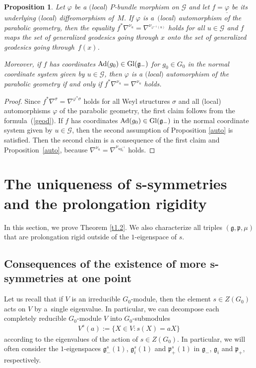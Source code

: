 \documentclass[pdftex]{sigma}
\newcommand{\si}{\sigma}
\newcommand{\un}{\underline}
\newcommand{\ba}{\mathcal{G}}
\newcommand{\va}{\varphi}
\newcommand{\fg}{\mathfrak g}
\newcommand{\fp}{\mathfrak p}
\newcommand{\Ad}{{\rm Ad}}
\numberwithin{equation}{section}
\newtheorem{Proposition}[Theorem]{Proposition}
 { \theoremstyle{definition}
\newtheorem{Definition}[Theorem]{Definition}
\newtheorem{Example}[Theorem]{Example}
\newtheorem{Remark}[Theorem]{Remark} }
\begin{document}
\begin{Proposition}\label{prop2.4}
Let $\va$ be a $($local$)$ $P$-bundle morphism on $\ba$ and let $f=\un{\va}$ be its underlying $($local$)$ diffeomorphism of~$M$. If $\va$ is a~$($local$)$ automorphism of the parabolic geometry, then the equality $f^*\nabla^{\nu_u}=\nabla^{\nu_{\va^{-1}(u)}}$ holds for all $u\in \ba$ and $f$ maps the set of generalized geodesics going through $x$ onto the set of generalized geodesics going through~$f(x)$.

Moreover, if $f$ has coordinates $\Ad(g_0)\in {\rm Gl}(\fg_-)$ for $g_0\in G_0$ in the normal coordinate system given by $u\in \ba$, then $\va$ is a $($local$)$ automorphism of the parabolic geometry if and only if $f^*\nabla^{\nu_u}=\nabla^{\nu_{u}}$ holds.
\end{Proposition}
\begin{proof}
Since $f^*\nabla^\si=\nabla^{\va^*\si}$ holds for all Weyl structures $\si$ and all (local) automorphisms $\va$ of the parabolic geometry, the f\/irst claim follows from the formula~(\ref{geod}). If $f$ has coordinates $\Ad(g_0)\in {\rm Gl}(\fg_-)$ in the normal coordinate system given by $u\in \ba$, then the second assumption of Proposition \ref{auto} is satisf\/ied. Then the second claim is a consequence of the f\/irst claim and Proposition~\ref{auto}, because $\nabla^{\nu_u}=\nabla^{\nu_{ug_0^{-1}}}$ holds.
\end{proof}

\section[The uniqueness of $s$-symmetries and the prolongation rigidity]{The uniqueness of $\boldsymbol{s}$-symmetries and the prolongation rigidity}\label{SEC3}

In this section, we prove Theorem \ref{t1.2}. We also characterize all triples $(\fg,\fp,\mu)$ that are prolongation rigid outside of the $1$-eigenspace of $s$.

\subsection[Consequences of the existence of more $s$-symmetries at one point]{Consequences of the existence of more $\boldsymbol{s}$-symmetries at one point}\label{sec3.1}

Let us recall that if $V$ is an irreducible $G_0$-module, then the element $s\in Z(G_0)$ acts on $V$ by a~single eigenvalue. In particular, we can decompose each completely reducible $G_0$-module $V$ into $G_0$-submodules \begin{gather*}V^s(a):=\{X\in V\colon s(X)=aX\}\end{gather*}
according to the eigenvalues of the action of $s\in Z(G_0)$. In particular, we will often consider the $1$-eigenspaces $\fg_-^s(1)$, $\fg_i^s(1)$ and $\fp_+^s(1)$ in $\fg_-$, $\fg_i$ and $\fp_+$, respectively.
\end{document}
